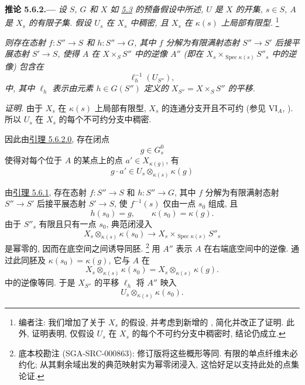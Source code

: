 
\medskip
{}\label{cor:sga3-VIB-5.6.2}%
\noindent\textbf{推论 5.6.2.---}
\emph{设 \(S\), \(G\) 和 \(X\) 如
\hyperref[thm:sga3-VIB-5.3]{5.3} 的预备假设中所述,
\(U\) 是 \(X\) 的开集, \(s\in S\), \(A\) 是 \(X_s\) 的有限子集.
假设 \(U_s\) 在 \(X_s\) 中稠密,
且 \(X_s\) 在 \(\kappa(s)\) 上局部有限型.}%
\footnote{\label{note:sga3-VIB-43}编者注: 我们增加了关于 \(X_s\) 的假设,
并考虑到新增的 ,
简化并改正了证明. 此外, 证明表明, 仅假设 \(U_s\)
在 \(X_s\) 的每个不可约分支中稠密时, 结论仍成立.}

\emph{则存在态射 \(f:S''\to S\) 和 \(h:S''\to G\),
其中 \(f\) 分解为有限满射态射 \(S''\to S'\)
后接平展态射 \(S'\to S\), 使得 \(A\) 在 \(X\times_S S''\)
中的逆像 \(A''\) \textup{(即在
\(X_s\times_{\operatorname{Spec}\kappa(s)}S''_s\) 中的逆像)} 包含在}
\[
  \ell_h^{-1}(U_{S''}),
\]
\emph{中, 其中 \(\ell_h\) 表示由元素
\(h\in G(S'')\) 定义的 \(X_{S''}=X\times_S S''\) 的平移.}

\emph{证明.}
由于 \(X_s\) 在 \(\kappa(s)\) 上局部有限型,
\(X_s\) 的连通分支开且不可约
(参见 VI\(_A\), ).
所以 \(U_s\) 在 \(X_s\) 的每个不可约分支中稠密.

因此由\hyperref[lem:sga3-VIB-5.6.2.0]{引理 5.6.2.0}, 存在闭点
\[
  g\in G_s^0
\]
使得对每个位于 \(A\) 的某点上的点 \(a'\in X_{\kappa(g)}\), 有
\[
  g\cdot a'\in U_s\otimes_{\kappa(s)}\kappa(g)
\]

由\hyperref[lem:sga3-VIB-5.6.1]{引理 5.6.1},
存在态射 \(f:S''\to S\) 和 \(h:S''\to G\),
其中 \(f\) 分解为有限满射态射 \(S''\to S'\)
后接平展态射 \(S'\to S\),
使 \(f^{-1}(s)\) 仅由一点 \(s_0\) 组成, 且
\[
  h(s_0)=g,\qquad \kappa(s_0)=\kappa(g).
\]
由于 \(S''_s\) 有限且只有一点 \(s_0\), 典范闭浸入
\[
  X_s\otimes_{\kappa(s)}\kappa(s_0)
  \longrightarrow
  X_s\times_{\operatorname{Spec}\kappa(s)}S''_s
\]
是幂零的, 因而在底空间之间诱导同胚.
\footnote{底本校勘注 (SGA-SRC-000863): 修订版将这些概形等同.
有限的单点纤维未必约化; 从其剩余域出发的典范映射实为幂零闭浸入,
这恰好足以支持此处的点集论证.}
用 \(A''\) 表示 \(A\) 在右端底空间中的逆像.
通过此同胚及 \(\kappa(s_0)=\kappa(g)\),
它与 \(A\) 在
\[
  X_s\otimes_{\kappa(s)}\kappa(s_0)
  =X_s\otimes_{\kappa(s)}\kappa(g).
\]
中的逆像等同. 于是 \(X_{S''}\) 的平移 \(\ell_h\) 将 \(A''\) 映入
\[
  U_s\otimes_{\kappa(s)}\kappa(s_0).
\]

